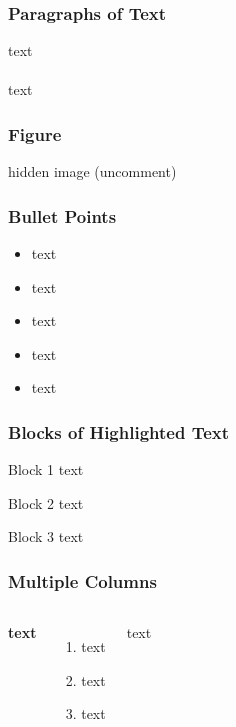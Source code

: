 \documentclass[xcolor=table]{beamer}
\begin{document}
\begin{frame}
\frametitle{Paragraphs of Text}
text\\~\\

text
\end{frame}


\begin{frame}
\frametitle{Figure}
hidden image (uncomment)
\end{frame}


\begin{frame}
\frametitle{Bullet Points}
\begin{itemize}
\item text
\item text
\item text
\item text
\item text
\end{itemize}
\end{frame}


\begin{frame}
\frametitle{Blocks of Highlighted Text}
\begin{block}{Block 1}
text
\end{block}

\begin{block}{Block 2}
text
\end{block}

\begin{block}{Block 3}
text
\end{block}
\end{frame}


\begin{frame}
\frametitle{Multiple Columns}
\begin{columns}[c] %

\textbf{text}
\begin{enumerate}
\item text
\item text
\item text
\end{enumerate}

text

\end{columns}
\end{frame}
\end{document}
